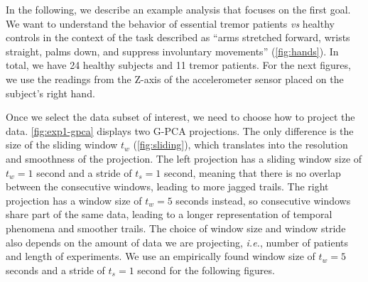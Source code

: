 In the following, we describe an example analysis that focuses on the first goal. We want to understand the behavior of essential tremor patients \emph{vs} healthy controls in the context of the task described as ``arms stretched forward, wrists straight, palms down, and suppress involuntary movements'' (\cref{fig:hands}). In total, we have 24 healthy subjects and 11 tremor patients. For the next figures, we use the readings from the Z-axis of the accelerometer sensor placed on the subject's right hand. 

Once we select the data subset of interest, we need to choose how to project the data. \cref{fig:exp1-gpca} displays two G-PCA projections. The only difference is the size of the sliding window $t_w$ (\cref{fig:sliding}), which translates into the resolution and smoothness of the projection. The left projection has a sliding window size of $t_w=1$ second and a stride of $t_s=1$ second, meaning that there is no overlap between the consecutive windows, leading to more jagged trails. The right projection has a window size of $t_w=5$ seconds instead, so consecutive windows share part of the same data, leading to a longer representation of temporal phenomena and smoother trails. The choice of window size and window stride also depends on the amount of data we are projecting, \emph{i.e.}, number of patients and length of experiments. We use an empirically found window size of $t_w=5$ seconds and a stride of $t_s=1$ second for the following figures. 

